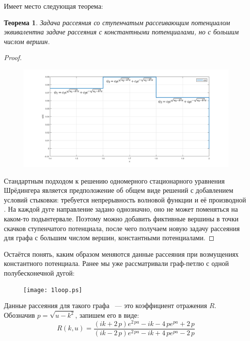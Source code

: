 \documentclass[a4 paper, 12 pt]{extarticle}
\newtheorem{theorem}{Теорема}[section]
\begin{document}
   Имеет место следующая теорема:
   \begin{theorem}
   	Задача рассеяния со ступенчатым рассеивающим потенциалом эквивалентна задаче рассеяния с константными потенциалами, но с большим числом вершин.
   \end{theorem}
   \begin{proof}
   	\begin{figure}[!htb]
   		\centering
   		\includegraphics[scale=0.5]{step.png}
   	\end{figure}
   	Стандартным подходом к решению одномерного стационарного уравнения Шрёдингера является предположение об общем виде решений с добавлением условий стыковки: требуется непрерывность волновой функции и её производной \cite{Peisakhovich}. На каждой дуге направление задано однозначно, оно не может поменяться на каком-то подынтервале. Поэтому можно добавить фиктивные вершины в точки скачков ступенчатого потенциала, после чего получаем новую задачу рассеяния для графа с большим числом вершин, константными потенциалами. 
   \end{proof}
      
   Остаётся понять, каким образом меняются данные рассеяния при возмущениях константного потенциала.
   Ранее мы уже рассматривали граф-петлю с одной полубесконечной дугой:
   \begin{figure}[!htb]
   	\centering
   	\texttt{[image: 1loop.ps]}
   \end{figure}


   Данные рассеяния для такого графа ~--- это коэффициент отражения $R$. Обозначив $p=\sqrt{u-k^2}$, запишем его в виде:
   \begin{equation}
   \label{OneDimensionalReflection}
   R\left(k,u\right) = {\frac { \left( ik+2\,p \right) {e}^{2\,pa}-ik-4\,p{e}^{pa}+2\,p}{ \left( ik-2\,p \right) {e}^{2\,pa}-ik+4\,p{e}^{pa}-2\,p}}
   \end{equation}
   
\end{document}
